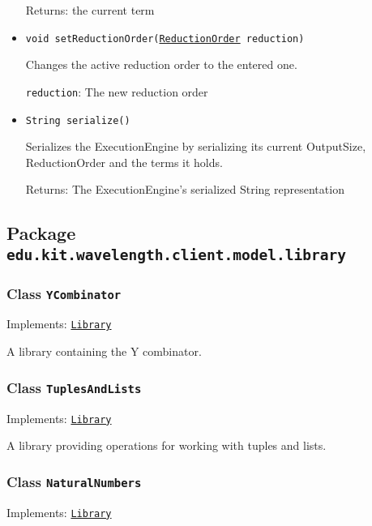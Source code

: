 \begin{itemize}
Returns: the current term

\item \texttt{void setReductionOrder(\hyperref[type:edu.kit.wavelength.client.model.reduction.ReductionOrder]{ReductionOrder} reduction)}

Changes the active reduction order to the entered one.

\texttt{reduction}: The new reduction order

\item \texttt{String serialize()}

Serializes the ExecutionEngine by serializing its current OutputSize, ReductionOrder and the terms it holds.

Returns: The ExecutionEngine's serialized String representation

\end{itemize}

\subsection{Package \lstinline{edu.kit.wavelength.client.model.library}}
\label{pkg:edu.kit.wavelength.client.model.library}


\subsubsection{Class \texttt{YCombinator}}
\label{type:edu.kit.wavelength.client.model.library.YCombinator}
Implements: \texttt{\hyperref[type:edu.kit.wavelength.client.model.library.Library]{Library}}

A library containing the Y combinator.

\subsubsection{Class \texttt{TuplesAndLists}}
\label{type:edu.kit.wavelength.client.model.library.TuplesAndLists}
Implements: \texttt{\hyperref[type:edu.kit.wavelength.client.model.library.Library]{Library}}

A library providing operations for working with
 tuples and lists.

\subsubsection{Class \texttt{NaturalNumbers}}
\label{type:edu.kit.wavelength.client.model.library.NaturalNumbers}
Implements: \texttt{\hyperref[type:edu.kit.wavelength.client.model.library.Library]{Library}}

